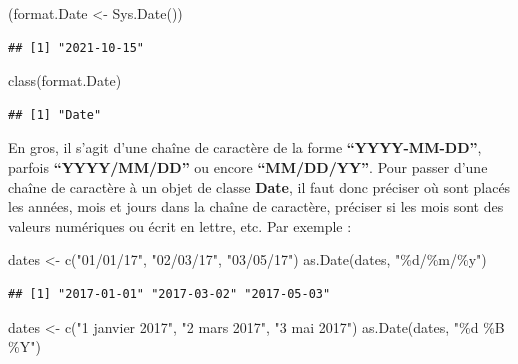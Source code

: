 \documentclass[
]{book}
\newenvironment{Shaded}{\begin{snugshade}}{\end{snugshade}}
\newcommand{\FunctionTok}[1]{\textcolor[rgb]{0.00,0.00,0.00}{#1}}
\newcommand{\NormalTok}[1]{#1}
\newcommand{\OtherTok}[1]{\textcolor[rgb]{0.56,0.35,0.01}{#1}}
\newcommand{\StringTok}[1]{\textcolor[rgb]{0.31,0.60,0.02}{#1}}
\theoremstyle{definition}
\theoremstyle{definition}
\theoremstyle{definition}
\theoremstyle{definition}
\theoremstyle{remark}
\begin{document}
\begin{Shaded}
\begin{Highlighting}[]
\NormalTok{(format.Date }\OtherTok{\textless{}{-}} \FunctionTok{Sys.Date}\NormalTok{())}
\end{Highlighting}
\end{Shaded}

\begin{verbatim}
## [1] "2021-10-15"
\end{verbatim}

\begin{Shaded}
\begin{Highlighting}[]
\FunctionTok{class}\NormalTok{(format.Date)}
\end{Highlighting}
\end{Shaded}

\begin{verbatim}
## [1] "Date"
\end{verbatim}

En gros, il s'agit d'une chaîne de caractère de la forme \textbf{``YYYY-MM-DD''}, parfois \textbf{``YYYY/MM/DD''} ou encore \textbf{``MM/DD/YY''}. Pour passer d'une chaîne de caractère à un objet de classe \textbf{Date}, il faut donc préciser où sont placés les années, mois et jours dans la chaîne de caractère, préciser si les mois sont des valeurs numériques ou écrit en lettre, etc. Par exemple :

\begin{Shaded}
\begin{Highlighting}[]
\NormalTok{dates }\OtherTok{\textless{}{-}} \FunctionTok{c}\NormalTok{(}\StringTok{"01/01/17"}\NormalTok{, }\StringTok{"02/03/17"}\NormalTok{, }\StringTok{"03/05/17"}\NormalTok{)}
\FunctionTok{as.Date}\NormalTok{(dates, }\StringTok{"\%d/\%m/\%y"}\NormalTok{)}
\end{Highlighting}
\end{Shaded}

\begin{verbatim}
## [1] "2017-01-01" "2017-03-02" "2017-05-03"
\end{verbatim}

\begin{Shaded}
\begin{Highlighting}[]
\NormalTok{dates }\OtherTok{\textless{}{-}} \FunctionTok{c}\NormalTok{(}\StringTok{"1 janvier 2017"}\NormalTok{, }\StringTok{"2 mars 2017"}\NormalTok{, }\StringTok{"3 mai 2017"}\NormalTok{)}
\FunctionTok{as.Date}\NormalTok{(dates, }\StringTok{"\%d \%B \%Y"}\NormalTok{)}
\end{Highlighting}
\end{Shaded}
\end{document}
